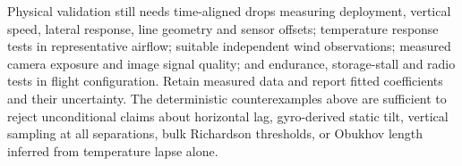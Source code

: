 Physical validation still needs time-aligned drops measuring deployment,
vertical speed, lateral response, line geometry and sensor offsets;
temperature response tests in representative airflow; suitable independent
wind observations; measured camera exposure and image signal quality;
and endurance, storage-stall and radio tests in flight configuration.
Retain measured data and report fitted coefficients and their uncertainty.
The deterministic counterexamples above are sufficient to reject
unconditional claims about horizontal lag, gyro-derived static tilt,
vertical sampling at all separations, bulk Richardson thresholds, or
Obukhov length inferred from temperature lapse alone.
